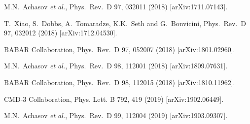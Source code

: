 \begin{thebibliography}{99}
  M.N.~Achasov {\it et al.},
  Phys.\ Rev.\ D 97, 032011 (2018)
  [arXiv:1711.07143].
   
  T.~Xiao, S.~Dobbs, A.~Tomaradze, K.K.~Seth and G.~Bonvicini,
  Phys.\ Rev.\ D 97, 032012 (2018)  
  [arXiv:1712.04530].

BABAR Collaboration,
  Phys.\ Rev.\ D 97, 052007 (2018)
  [arXiv:1801.02960].

  M.N.~Achasov {\it et al.},
  Phys.\ Rev.\ D 98, 112001 (2018)
  [arXiv:1809.07631].

BABAR Collaboration,
  Phys.\ Rev.\ D 98, 112015 (2018)
  [arXiv:1810.11962].

CMD-3 Collaboration,  Phys. Lett. B 792, 419 (2019)  [arXiv:1902.06449].
 
  M.N.~Achasov {\it et al.},
  Phys.\ Rev.\ D 99, 112004 (2019)
  [arXiv:1903.09307].
  

\end{thebibliography}
